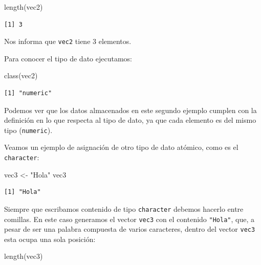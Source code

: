 \documentclass[
  spanish,
  letterpaper,
  DIV=11,
  numbers=noendperiod]{scrreprt}
\newenvironment{Shaded}{\begin{snugshade}}{\end{snugshade}}
\newcommand{\FunctionTok}[1]{\textcolor[rgb]{0.28,0.35,0.67}{#1}}
\newcommand{\NormalTok}[1]{\textcolor[rgb]{0.00,0.23,0.31}{#1}}
\newcommand{\OtherTok}[1]{\textcolor[rgb]{0.00,0.23,0.31}{#1}}
\newcommand{\StringTok}[1]{\textcolor[rgb]{0.13,0.47,0.30}{#1}}
\begin{document}
\begin{Shaded}
\begin{Highlighting}[]
\FunctionTok{length}\NormalTok{(vec2)}
\end{Highlighting}
\end{Shaded}

\begin{verbatim}
[1] 3
\end{verbatim}

Nos informa que \texttt{vec2} tiene 3 elementos.

Para conocer el tipo de dato ejecutamos:

\begin{Shaded}
\begin{Highlighting}[]
\FunctionTok{class}\NormalTok{(vec2)}
\end{Highlighting}
\end{Shaded}

\begin{verbatim}
[1] "numeric"
\end{verbatim}

Podemos ver que los datos almacenados en este segundo ejemplo cumplen
con la definición en lo que respecta al tipo de dato, ya que cada
elemento es del mismo tipo (\texttt{numeric}).

Veamos un ejemplo de asignación de otro tipo de dato atómico, como es el
\texttt{character}:

\begin{Shaded}
\begin{Highlighting}[]
\NormalTok{vec3 }\OtherTok{\textless{}{-}} \StringTok{"Hola"}
\NormalTok{vec3}
\end{Highlighting}
\end{Shaded}

\begin{verbatim}
[1] "Hola"
\end{verbatim}

Siempre que escribamos contenido de tipo \texttt{character} debemos
hacerlo entre comillas. En este caso generamos el vector \texttt{vec3}
con el contenido \texttt{"Hola"}, que, a pesar de ser una palabra
compuesta de varios caracteres, dentro del vector \texttt{vec3} esta
ocupa una sola posición:

\begin{Shaded}
\begin{Highlighting}[]
\FunctionTok{length}\NormalTok{(vec3)}
\end{Highlighting}
\end{Shaded}
\end{document}
